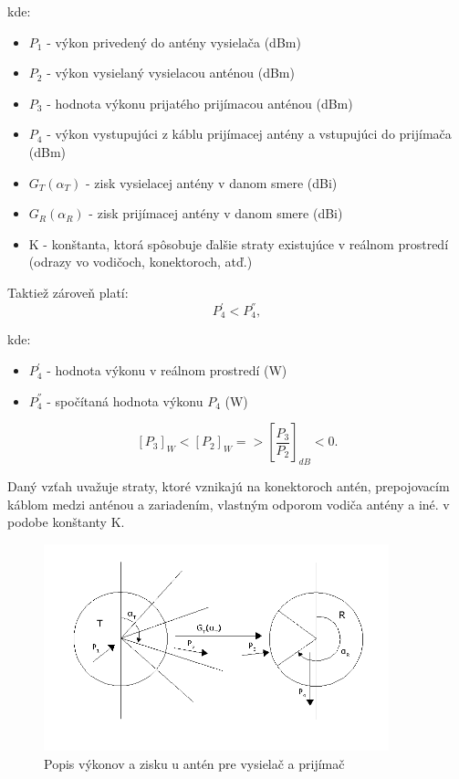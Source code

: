 \documentclass[11pt,twoside,a4paper]{book}
\begin{document}
kde:
\begin{itemize}
 \item $P_{1}$ - výkon privedený do antény vysielača (dBm)
 \item $P_{2}$ - výkon vysielaný vysielacou anténou (dBm)
 \item $P_{3}$ - hodnota výkonu prijatého prijímacou anténou (dBm)
 \item $P_{4}$ - výkon vystupujúci z káblu prijímacej antény a vstupujúci do prijímača (dBm)
 \item $G_{T}(\alpha_{T})$ - zisk vysielacej antény v danom smere (dBi)
 \item $G_{R}(\alpha_{R})$ - zisk prijímacej antény v danom smere (dBi)
 \item K - konštanta, ktorá spôsobuje ďalšie straty existujúce v reálnom prostredí (odrazy vo vodičoch, konektoroch, atď.)
\end{itemize}

Taktiež zároveň platí:
$$
P_{4}^{'} < P_{4}^{''},
$$

kde:
\begin{itemize}
 \item $P_{4}^{'}$ - hodnota výkonu v reálnom prostredí (W) 
 \item $P_{4}^{''}$ - spočítaná hodnota výkonu $P_{4}$ (W)
\end{itemize}

$$
\left[P_{3}\right]_{W} < \left[P_{2}\right]_{W} => \left[\frac{P_{3}}{P_{2}}\right]_{dB} < 0.
$$

Daný vzťah uvažuje straty, ktoré vznikajú na konektoroch antén, prepojovacím káblom medzi anténou a zariadením, vlastným odporom vodiča antény a iné. v podobe konštanty K.


\begin{figure}[htbp]
 \centering
 \includegraphics[width=10cm]{./figures/FSPL.png}
 \caption{Popis výkonov a zisku u antén pre vysielač a prijímač}
 \label{fig:FSPL}
\end{figure}
\end{document}
